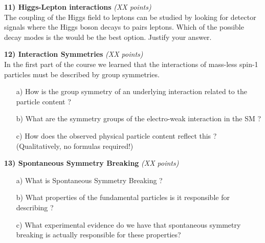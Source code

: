 {\textbf{11) Higgs-Lepton interactions } \hfill \textit{(XX points)}\\
The coupling of the Higgs field to leptons can be studied by looking for detector signals where the Higgs boson decays to pairs leptons.
Which of the possible decay modes is the would be the best option.  Justify your answer.

\vspace*{1in}

\clearpage

\textbf{12) Interaction Symmetries } \hfill \textit{(XX points)} \\ 
In the first part of the course we learned that the interactions of mass-less spin-1 particles must be described by group symmetries. 
\begin{itemize}
\item[a)] {How is the group symmetry of an underlying interaction related to the particle content ?}
\vspace*{1in}
\item[b)]{ What are the symmetry groups of the electro-weak interaction in the SM ? }
\vspace*{1in}
\item[c)]{How does the observed physical particle content reflect this ? (Qualitatively, no formulas required!) }
\vspace*{1in}
\end{itemize}

\textbf{13) Spontaneous Symmetry Breaking} \hfill \textit{(XX points)} \\ 
\begin{itemize}
\item[a)]{What is Spontaneous Symmetry Breaking  ?  }
\vspace*{1in}
\item[b)]{What properties of the fundamental particles is it responsible for describing ?}
\vspace*{1in}
\item[c)]{What experimental evidence do we have that spontaneous symmetry breaking is actually responsible for these properties?}
\end{itemize}



} %

